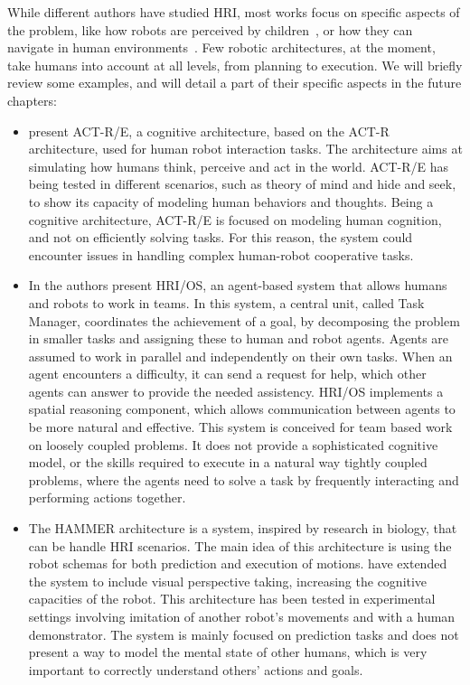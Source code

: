 While different authors have studied HRI, most works focus on specific aspects of the problem, like how robots are perceived by children~\citep{kozima2007children}, or how they can navigate in human environments~\citep{sisbot2007human}. Few robotic architectures, at the moment, take humans into account at all levels, from planning to execution. We will briefly review some examples, and will detail a part of their specific aspects in the future chapters:
\begin{itemize} 
\item \cite{trafton2013act} present ACT-R/E, a cognitive architecture, based
on the ACT-R architecture, used for human robot interaction tasks. The
architecture aims at simulating how humans think, perceive and act in
the world. ACT-R/E has being tested in different scenarios, such as
theory of mind and hide and seek, to show its capacity of modeling
human behaviors and thoughts. Being a cognitive architecture, ACT-R/E is focused on modeling human 
cognition, and not on efficiently solving tasks. For this reason, the system could encounter issues in handling complex human-robot cooperative tasks. 

\item In \cite{Fong_2006} the authors present  HRI/OS, an agent-based system
that allows humans and robots to work in teams. In this system, a central unit, called Task Manager, coordinates the achievement of a goal, by decomposing the problem in smaller tasks and assigning these to human and robot agents. Agents are assumed to work in parallel and independently on their own tasks. When an agent encounters a difficulty, it can send a request for help, which other agents can answer to provide the needed assistency. HRI/OS implements a spatial reasoning component, which allows communication between agents to be more natural and effective. This system is conceived for team based work on loosely coupled problems. It does not provide a sophisticated cognitive model, or the skills required to execute in a natural way tightly coupled problems, where the agents need to solve a task by frequently interacting and performing actions together. 

\item  The HAMMER architecture \citep{demiris2003distributed} is a system, inspired by
research in biology, that can be handle HRI scenarios. The main idea of this architecture is
using the robot schemas for both prediction and execution of motions. \cite{johnson2005perceptual} have extended the system to include visual perspective taking, increasing the cognitive capacities of the robot.  This architecture has been tested in experimental settings involving imitation of another robot's movements and with a human demonstrator.  The system is mainly focused on prediction tasks and does not present a way to model the mental state of other humans, which is very important to correctly understand others' actions and goals.


\end{itemize}
